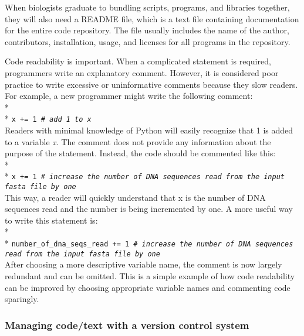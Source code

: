 \documentclass[ChapterTOCs,krantz2]{krantz} %
\begin{document}
When biologists graduate to bundling scripts, programs, and libraries together,
they will also need a README file, which is a text file containing
documentation for the entire code repository. The file usually includes
the name of the author, contributors,
installation, usage, and licenses for all programs in the repository.  

Code readability is important.  
When a complicated statement is required, programmers write an 
explanatory comment.
However, it is considered poor practice to write excessive or 
uninformative comments
because they slow
readers.  For example, a new programmer might write the following comment:\\* \\*
\texttt{x += 1  \emph{\# add 1 to x}}\\

Readers with minimal knowledge of Python will easily recognize that 1 is added
to a variable \emph{x}. The comment does not provide any information about the purpose
of the statement. Instead, the code should be commented like this:\\* \\*
\texttt{x += 1  \emph{\# increase the number of DNA sequences read from the
input fasta file by one}}\\

This way, a reader will quickly understand that x is the number of DNA
sequences read and the number is being incremented by one.  A more useful way
to write this statement is:\\* \\*
\texttt{number\_of\_dna\_seqs\_read += 1
\emph{\# increase the number of DNA sequences read from the input fasta file
by one}}\\

After choosing a more descriptive variable name, the comment is now largely
redundant and can be omitted. 
This is a simple example of how code readability can be improved 
by choosing appropriate variable names and commenting code sparingly.

\subsubsection{Managing code/text with a version control system}
\end{document}
